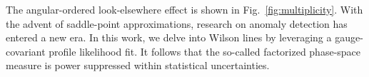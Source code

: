 The angular-ordered look-elsewhere effect is shown in
Fig.~\ref{fig:multiplicity}. With the advent of saddle-point
approximations, research on anomaly detection has entered a new era. In
this work, we delve into Wilson lines by leveraging a gauge-covariant
profile likelihood fit. It follows that the so-called factorized
phase-space measure is power suppressed within statistical
uncertainties.

